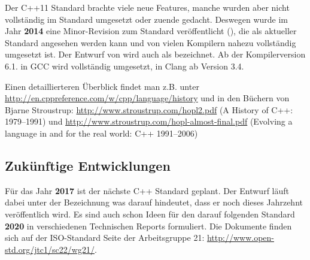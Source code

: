 Der C++11 Standard brachte viele neue Features, manche wurden aber nicht vollständig im Standard umgesetzt oder zuende gedacht. Deswegen wurde im Jahr \textbf{2014} eine Minor-Revision zum Standard veröffentlicht (), die als aktueller Standard angesehen werden kann und von vielen Kompilern nahezu vollständig umgesetzt ist. Der Entwurf von  wird auch als  bezeichnet. Ab der Kompilerversion 6.1. in GCC wird  vollständig umgesetzt, in Clang ab Version 3.4.

Einen detaillierteren Überblick findet man z.B. unter \url{http://en.cppreference.com/w/cpp/language/history} und in den Büchern von Bjarne Stroustrup: \url{http://www.stroustrup.com/hopl2.pdf} (A History of C++: 1979--1991) und \url{http://www.stroustrup.com/hopl-almost-final.pdf} (Evolving a language in and for the real world: C++ 1991--2006)

\subsection{Zukünftige Entwicklungen}
Für das Jahr \textbf{2017} ist der nächste C++ Standard geplant. Der Entwurf läuft dabei unter der Bezeichnung  was darauf hindeutet, dass er noch dieses Jahrzehnt veröffentlich wird. Es sind auch schon Ideen für den darauf folgenden Standard \textbf{2020} in verschiedenen Technischen Reports formuliert. Die Dokumente finden sich auf der ISO-Standard Seite der Arbeitsgruppe 21: \url{http://www.open-std.org/jtc1/sc22/wg21/}.

